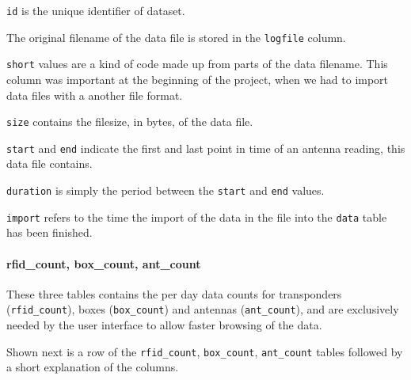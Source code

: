 \begin{mydesc}
	\item \lstinline|id| is the unique identifier of dataset.
	\item The original filename of the data file is stored in the \lstinline|logfile| column.
	\item \lstinline|short| values are a kind of code made up from parts of the data filename. This column was important at the beginning of the project, when we had to import data files with a another file format.
	\item \lstinline|size| contains the filesize, in bytes, of the data file.
	\item \lstinline|start| and \lstinline|end| indicate the first and last point in time of an antenna reading, this data file contains.
	\item \lstinline|duration| is simply the period between the \lstinline|start| and \lstinline|end| values.
	\item \lstinline|import| refers to the time the import of the data in the file into the \lstinline|data| table has been finished.
\end{mydesc}

\paragraph{rfid\_count, box\_count, ant\_count}
\label{para:counts}

These three tables contains the per day data counts for transponders (\lstinline|rfid_count|), boxes (\lstinline|box_count|) and antennas (\lstinline|ant_count|), and are exclusively needed by the user interface to allow faster browsing of the data.

Shown next is a row of the \lstinline|rfid_count|, \lstinline|box_count|, \lstinline|ant_count| tables followed by a short explanation of the columns.

